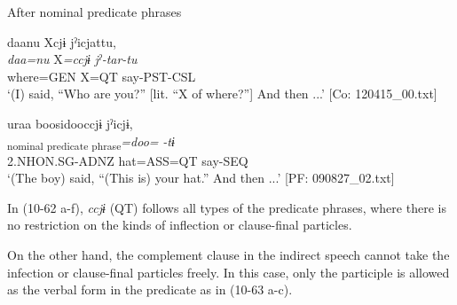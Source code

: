 \begin{xlist}
  \exi{} After nominal predicate phrases

  \ex  %
      \glll    daanu  Xcjɨ  jˀicjattu,\\
      \textit{daa=nu}  X\textit{=ccjɨ}  \textit{jˀ-tar-tu}\\
      where=GEN  X=QT  say-PST-CSL\\
      \glt       ‘(I) said, “Who are you?” [lit. “X of where?”] And then ...’ [Co: 120415\_00.txt]

  \ex %
      \glll    uraa  {\textbar}boosi{\textbar}dooccjɨ  jˀicjɨ,\\
      [\textit{ura-a}  \textit{boosi}]\textsubscript{nominal predicate phrase}\textit{=doo=}  \textit{-tɨ}\\
      2.NHON.SG-ADNZ  hat=ASS=QT  say-SEQ\\
      \glt       ‘(The boy) said, “(This is) your hat.” And then ...’ [PF: 090827\_02.txt]
  \end{xlist}
\z

In (10-62 a-f), \textit{ccjɨ} (QT) follows all types of the predicate phrases, where there is no restriction on the kinds of inflection or clause-final particles.

On the other hand, the complement clause in the indirect speech cannot take the infection or clause-final particles freely. In this case, only the participle is allowed as the verbal form in the predicate as in (10-63 a-c).


